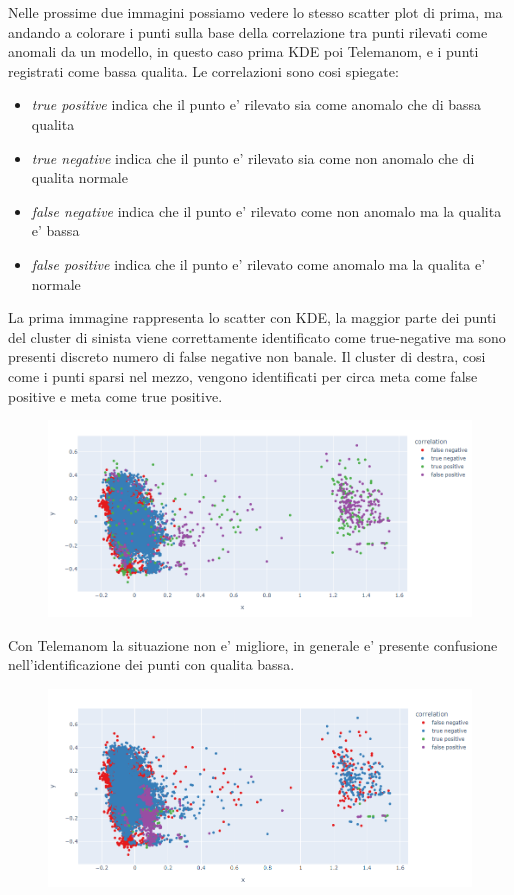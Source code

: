 Nelle prossime due immagini possiamo vedere lo stesso scatter plot di prima, ma andando a colorare i punti sulla base della correlazione tra punti rilevati come anomali da un modello, in questo caso prima KDE poi Telemanom, e i punti registrati come bassa qualita. Le correlazioni sono cosi spiegate:
\begin{itemize}
\item \textit{true positive} indica che il punto e' rilevato sia come anomalo che di bassa qualita
\item \textit{true negative} indica che il punto e' rilevato sia come non anomalo che di qualita normale
\item \textit{false negative} indica che il punto e' rilevato come non anomalo ma la qualita e' bassa
\item \textit{false positive} indica che il punto e' rilevato come anomalo ma la qualita e' normale
\end{itemize}

 La prima immagine rappresenta lo scatter con KDE, la maggior parte dei punti del cluster di sinista viene correttamente identificato come true-negative ma sono presenti discreto numero di false negative non banale. Il cluster di destra, cosi come i punti sparsi nel mezzo, vengono identificati per circa meta come false positive e meta come true positive.
\begin{figure}[t]
\includegraphics[width=14cm, scale=1]{images/correlation_ssb1_quality_plot.png}
\centering
\end{figure}

Con Telemanom la situazione non e' migliore, in generale e' presente confusione nell'identificazione dei punti con qualita bassa.


\begin{figure}[t]
\includegraphics[width=14cm, scale=1]{images/worst_correlation_ssb1_quality_plot}
\centering
\end{figure}

